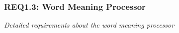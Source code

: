 \subsubsection{REQ1.3: Word Meaning Processor}

\textit{Detailed requirements about the word meaning processor}
